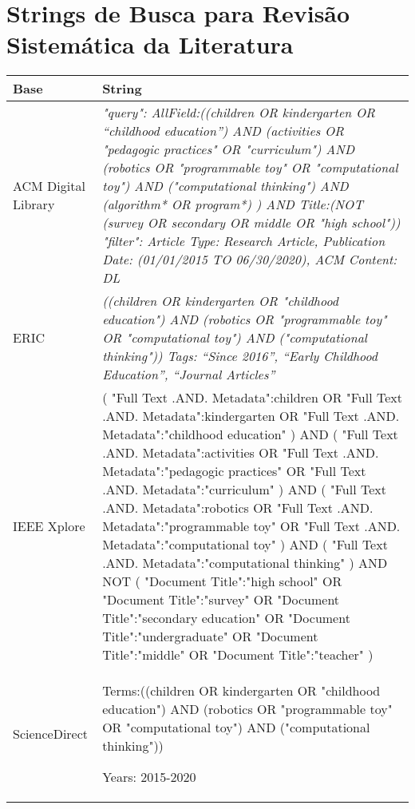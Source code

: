 \chapter{Strings de Busca para Revisão Sistemática da Literatura}
\label{apendice_a}

\begin{longtable}{|p{}|p{}|}
\hline
\textbf{Base} & \textbf{String} \\ \hline
ACM Digital Library & \textit{"query": { AllField:((children OR kindergarten OR “childhood education”)
AND (activities OR "pedagogic practices" OR "curriculum") AND (robotics
OR "programmable toy" OR "computational toy") AND ("computational
thinking") AND (algorithm* OR program*) ) AND Title:(NOT (survey OR
secondary OR middle OR "high school")) }
"filter": { Article Type: Research Article, Publication Date: (01/01/2015 TO
06/30/2020), ACM Content: DL }} \\ \hline

ERIC & \textit{((children OR kindergarten OR "childhood education")  AND (robotics OR "programmable toy" OR "computational toy") AND ("computational thinking"))
Tags: “Since 2016”, “Early Childhood Education”, “Journal Articles”} \\ \hline

IEEE Xplore & (
"Full Text .AND. Metadata":children OR 
"Full Text .AND. Metadata":kindergarten OR 
"Full Text .AND. Metadata":"childhood education"
) AND
(
"Full Text .AND. Metadata":activities OR 
"Full Text .AND. Metadata":"pedagogic practices" OR 
"Full Text .AND. Metadata":"curriculum"
) AND
(
"Full Text .AND. Metadata":robotics OR 
"Full Text .AND. Metadata":"programmable toy" OR 
"Full Text .AND. Metadata":"computational toy"
) AND
(
"Full Text .AND. Metadata":"computational thinking"
) AND NOT
(
"Document Title":"high school" OR
"Document Title":"survey" OR
"Document Title":"secondary education" OR
"Document Title":"undergraduate" OR
"Document Title":"middle" OR
"Document Title":"teacher"
)
\\ \hline

ScienceDirect & Terms:((children OR kindergarten OR "childhood education")  AND (robotics OR "programmable toy" OR "computational toy") AND ("computational thinking"))

Years: 2015-2020 \\ \hline

\end{longtable}


% 
